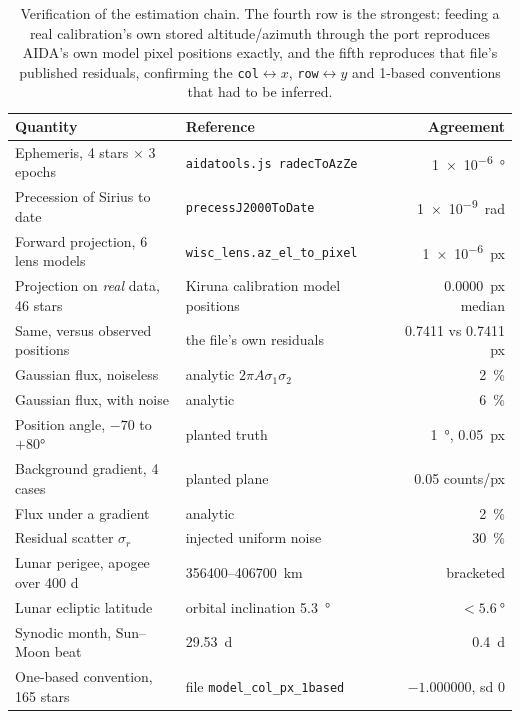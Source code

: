 \documentclass[11pt,a4paper]{article}
\begin{document}
\begin{table}[h]
\centering
\small
\begin{tabular}{llr}
\toprule
Quantity & Reference & Agreement \\
\midrule
Ephemeris, 4 stars $\times$ 3 epochs & \texttt{aidatools.js radecToAzZe} & \SI{1e-6}{\degree} \\
Precession of Sirius to date & \texttt{precessJ2000ToDate} & \SI{1e-9}{rad} \\
Forward projection, 6 lens models & \texttt{wisc\_lens.az\_el\_to\_pixel} & \SI{1e-6}{px} \\
Projection on \emph{real} data, 46 stars & Kiruna calibration model positions & \SI{0.0000}{px} median \\
Same, versus observed positions & the file's own residuals & \num{0.7411} vs \num{0.7411} px \\
Gaussian flux, noiseless & analytic $2\pi A\sigma_1\sigma_2$ & \SI{2}{\percent} \\
Gaussian flux, with noise & analytic & \SI{6}{\percent} \\
Position angle, $-70$ to $+80$\si{\degree} & planted truth & \SI{1}{\degree}, \SI{0.05}{px} \\
Background gradient, 4 cases & planted plane & \num{0.05} counts/px \\
Flux under a gradient & analytic & \SI{2}{\percent} \\
Residual scatter $\sigma_r$ & injected uniform noise & \SI{30}{\percent} \\
Lunar perigee, apogee over 400 d & \num{356400}--\SI{406700}{\kilo\meter} & bracketed \\
Lunar ecliptic latitude & orbital inclination \SI{5.3}{\degree} & $<\SI{5.6}{\degree}$ \\
Synodic month, Sun--Moon beat & \SI{29.53}{d} & \SI{0.4}{d} \\
One-based convention, 165 stars & file \texttt{model\_col\_px\_1based} & $-1.000000$, sd 0 \\
\bottomrule
\end{tabular}
\caption{Verification of the estimation chain. The fourth row is the strongest:
feeding a real calibration's own stored altitude/azimuth through the port
reproduces AIDA's own model pixel positions exactly, and the fifth reproduces
that file's published residuals, confirming the \texttt{col}$\leftrightarrow x$,
\texttt{row}$\leftrightarrow y$ and 1-based conventions that had to be inferred.}
\label{tab:verify}
\end{table}
\end{document}
